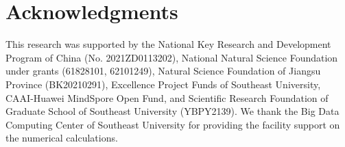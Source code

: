 \section*{Acknowledgments}
This research was supported by the National Key Research and Development Program of China (No. 2021ZD0113202), National Natural Science Foundation under grants (61828101, 62101249), Natural Science Foundation of Jiangsu Province (BK20210291), Excellence Project Funds of Southeast University, CAAI-Huawei MindSpore Open Fund, and Scientific Research Foundation of Graduate School of Southeast University (YBPY2139). We thank the Big Data Computing Center of Southeast University for providing the facility support on the numerical calculations. 